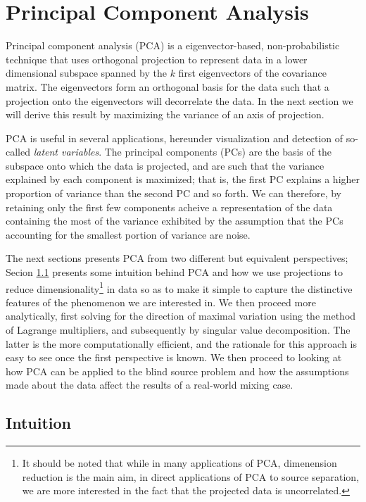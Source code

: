 \documentclass[11pt, oneside, a4paper]{report}
\begin{document}
\chapter{Principal Component Analysis}\label{pca}

Principal component analysis \cite{pearson1901} (PCA) is a eigenvector-based,
non-probabilistic technique that uses orthogonal projection to
represent data in a lower dimensional subspace spanned by the $k$
first eigenvectors of the covariance matrix. The eigenvectors form an
orthogonal basis for the data such that a projection onto the
eigenvectors will decorrelate the data. In the next section we will
derive this result by maximizing the variance of an axis of
projection.


PCA is useful in several applications, hereunder visualization and
detection of so-called \emph{latent variables}. The principal
components (PCs) are the basis of the subspace onto which the data is
projected, and are such that the variance explained by each component
is maximized; that is, the first PC explains a higher proportion of
variance than the second PC and so forth. We can therefore, by
retaining only the first few components acheive a representation of
the data containing the most of the variance exhibited by the
assumption that the PCs accounting for the smallest portion of
variance are noise.


The next sections presents PCA from two different but equivalent
perspectives; Secion \ref{pca_intuition} presents some intuition
behind PCA and how we use projections to reduce
dimensionality\footnote{It should be noted that while in many
  applications of PCA, dimenension reduction is the main aim, in
  direct applications of  PCA to source separation, we are more
  interested in the fact that the projected data is uncorrelated.} in data
so as to make it simple to capture the distinctive features of the
phenomenon we are interested in. We then proceed more
analytically, first solving for the direction of maximal variation
using the method of Lagrange multipliers, and subsequently by singular
value decomposition. The latter is the more computationally
efficient, and the rationale for this approach is easy to see once the
first perspective is known. We then proceed to looking at how PCA can
be applied to the blind source problem and how the assumptions made
about the data affect the results of a real-world mixing case.


\section{Intuition}\label{pca_intuition}
\end{document}
